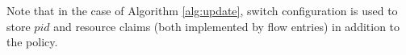 \documentclass[conference]{sigcomm-alternate}
\begin{document}
{\begin{algorithm}[h]
\begin{algorithmic}[1]
    \end{algorithmic}
\end{algorithm}

Note that in the case of Algorithm \ref{alg:update}, switch configuration is used to store $pid$ and resource claims (both implemented by flow entries) in addition to the policy.


%
%
%

}
\end{document}
